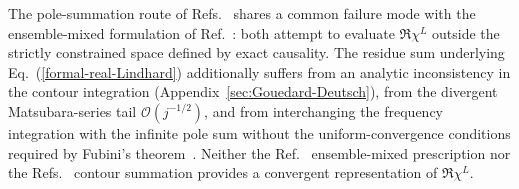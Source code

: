 \documentclass[aps,showkeys,noshowpacs,superscriptaddress,pre,preprint]{revtex4-2}
\begin{document}
The pole-summation route of Refs.~\cite{Khanna-Glyde1976,Gouedard-Deutsch1978} shares a common failure mode with the ensemble-mixed formulation of Ref.~\cite{Giuliani-Vignale2005}:
both attempt to evaluate $\Re\chi^L$ outside the strictly constrained space defined by exact causality.
The residue sum underlying Eq.~(\ref{formal-real-Lindhard}) additionally suffers from
an analytic inconsistency in the contour integration (Appendix~\ref{sec:Gouedard-Deutsch}),
from the divergent Matsubara-series tail $\mathcal{O}(j^{-1/2})$,
and from interchanging the frequency integration with the infinite pole sum without the uniform-convergence conditions required by Fubini's theorem~\cite{Rudin1976}.
Neither the Ref.~\cite{Giuliani-Vignale2005} ensemble-mixed prescription nor the Refs.~\cite{Khanna-Glyde1976,Gouedard-Deutsch1978} contour summation provides a convergent representation of $\Re\chi^L$.
\end{document}
